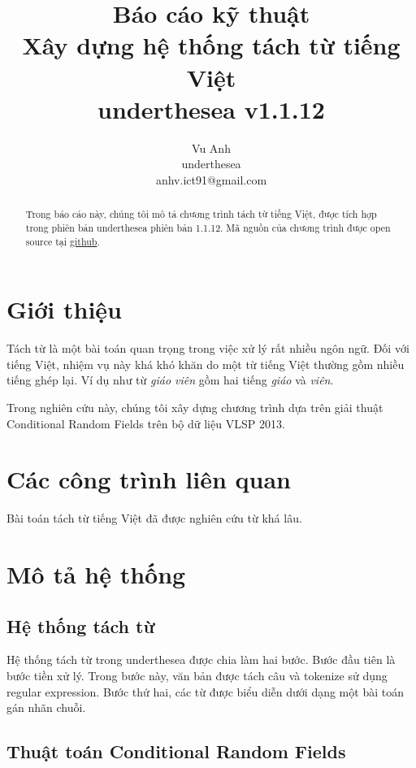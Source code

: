 \documentclass[11pt,a4paper]{article}
\title{Báo cáo kỹ thuật\\ Xây dựng hệ thống tách từ tiếng Việt \\ underthesea v1.1.12}
\author{
Vu Anh\\
underthesea\\
anhv.ict91@gmail.com
}
\date{}
\begin{document}
\maketitle
\begin{abstract}
Trong báo cáo này, chúng tôi mô tả chương trình tách từ tiếng Việt, được tích hợp trong phiên bản underthesea phiên bản 1.1.12.
Mã nguồn của chương trình được open source tại \href{https://github.com/undertheseanlp/word_tokenize}{github}.

\end{abstract}

\section{Giới thiệu}

Tách từ là một bài toán quan trọng trong việc xử lý rất nhiều ngôn ngữ. Đối với tiếng Việt, nhiệm vụ này khá khó khăn do một từ tiếng Việt thường gồm nhiều tiếng ghép lại. Ví dụ như từ \textit{giáo viên} gồm hai tiếng \textit{giáo} và \textit{viên}.

Trong nghiên cứu này, chúng tôi xây dựng chương trình dựa trên giải thuật Conditional Random Fields trên bộ dữ liệu VLSP 2013.

\section{Các công trình liên quan}

Bài toán tách từ tiếng Việt đã được nghiên cứu từ khá lâu.

\section{Mô tả hệ thống}

\subsection{Hệ thống tách từ}

Hệ thống tách từ trong underthesea được chia làm hai bước. Bước đầu tiên là bước tiền xử lý. Trong bước này, văn bản được tách câu và tokenize sử dụng regular expression. Bước thứ hai, các từ được biểu diễn dưới dạng một bài toán gán nhãn chuỗi.

\subsection{Thuật toán Conditional Random Fields}
\end{document}
